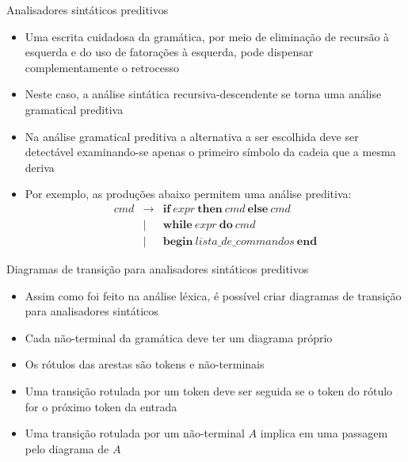 \begin{frame}[fragile]{Analisadores sintáticos preditivos}

    \begin{itemize}
        \item Uma escrita cuidadosa da gramática, por meio de eliminação de recursão à esquerda e do uso de fatorações à esquerda, pode dispensar complementamente
            o retrocesso

        \item Neste caso, a análise sintática recursiva-descendente se torna uma análise gramatical preditiva

        \item Na análise gramatical preditiva a alternativa a ser escolhida deve ser detectável examinando-se apenas o primeiro símbolo da cadeia que a mesma
            deriva

        \item Por exemplo, as produções abaixo permitem uma análise preditiva:
        \[
            \begin{array}{rcl}
                cmd & \to & \textbf{if}\ expr\ \textbf{then}\ cmd\ \textbf{else}\ cmd \\
                & | & \textbf{while}\ expr\ \textbf{do}\ cmd \\
                & | & \textbf{begin}\ lista\_de\_commandos \ \textbf{end}
            \end{array}
        \]
    \end{itemize}

\end{frame}

\begin{frame}[fragile]{Diagramas de transição para analisadores sintáticos preditivos}

    \begin{itemize}
        \item Assim como foi feito na análise léxica, é possível criar diagramas de transição para analisadores sintáticos

        \item Cada não-terminal da gramática deve ter um diagrama próprio

        \item Os rótulos das arestas são tokens e não-terminais

        \item Uma transição rotulada por um token deve ser seguida se o token do rótulo for o próximo token da entrada

        \item Uma transição rotulada por um não-terminal $A$ implica em uma passagem pelo diagrama de $A$
    \end{itemize}

\end{frame}

